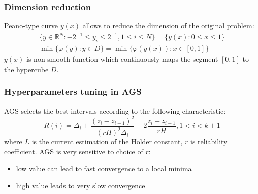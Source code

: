 \documentclass[aspectratio=1610]{beamer}
\begin{document}
\begin{frame}
  \begin{center}
  \frametitle{Dimension reduction}
  Peano-type curve \(y(x)\) allows to reduce the dimension of the original problem:
  \begin{gather}
    \lbrace y\in \mathbb{R}^N:-2^{-1}\leqslant y_i\leqslant 2^{-1},1\leqslant i\leqslant N\rbrace=\{y(x):0\leqslant x\leqslant 1\} \nonumber \\
    \min\{\varphi(y): y\in D\}=\min\{\varphi(y(x)): x\in [0,1]\} \nonumber
  \end{gather}
  \(y(x)\) is non-smooth function which continuously maps the segment \([0,1]\) to the hypercube \(D\).
  \begin{figure}[ht]
    \vspace*{-0.5cm}
  \end{figure}
\end{center}
\end{frame}

\begin{frame}
  \frametitle{Hyperparameters tuning in AGS}
  AGS selects the best intervals according to the following characteristic:
  \begin{displaymath}
    R(i)=\Delta_i+\dfrac{(z_i-z_{i-1})^2}{(rH)^2\Delta_i}-2\dfrac{z_i+z_{i-1}}{rH},1<i<k+1
  \end{displaymath}
  where $L$ is the current estimation of the Holder constant, $r$ is reliability coefficient.
  AGS is very sensitive to choice of $r$:
  \begin{itemize}
    \item low value can lead to fast convergence to a local minima
    \item high value leads to very slow convergence
  \end{itemize}
\end{frame}
\end{document}
